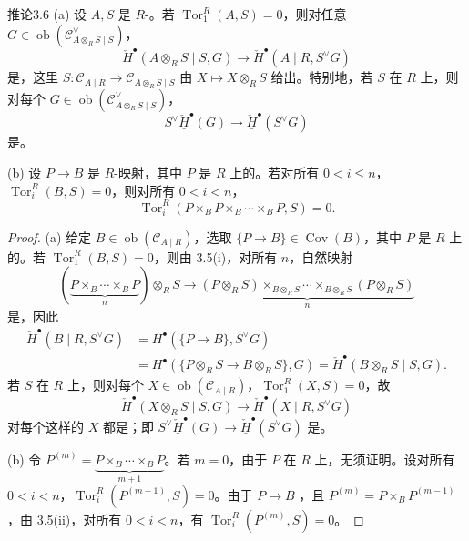 \begin{SGAresult}{推论}{3.6}
(a) 设 $A,S$ 是 $R$-。若 $\operatorname{Tor}_1^R(A,S)=0$，则对任意 $G\in\operatorname{ob}(\mathcal C_{A\otimes_R S\mid S}^{\vee})$，
\[\check H^{\bullet}(A\otimes_R S\mid S,G)\longrightarrow\check H^{\bullet}(A\mid R,S^{\vee}G)\]
是，这里 $S:\mathcal C_{A\mid R}\to\mathcal C_{A\otimes_R S\mid S}$ 由 $X\mapsto X\otimes_R S$ 给出。特别地，若 $S$ 在 $R$ 上，则对每个 $G\in\operatorname{ob}(\mathcal C_{A\otimes_R S\mid S}^{\vee})$，
\[S^{\vee}\check{\underline H}^{\bullet}(G)\longrightarrow\check{\underline H}^{\bullet}(S^{\vee}G)\]
是。

(b) 设 $P\to B$ 是 $R$-映射，其中 $P$ 是 $R$ 上的。若对所有 $0<i\leq n$，$\operatorname{Tor}_i^R(B,S)=0$，则对所有 $0<i<n$，
\[\operatorname{Tor}_i^R(P\mathbin{\times_B}P\mathbin{\times_B}\cdots\mathbin{\times_B}P,S)=0.\]
\end{SGAresult}
\begin{proof}
(a) 给定 $B\in\operatorname{ob}(\mathcal C_{A\mid R})$，选取 $\{P\to B\}\in\operatorname{Cov}(B)$，其中 $P$ 是 $R$ 上的。若 $\operatorname{Tor}_1^R(B,S)=0$，则由 3.5(i)，对所有 $n$，自然映射
\[(\underbrace{P\mathbin{\times_B}\cdots\mathbin{\times_B}P}_{n})\otimes_R S\longrightarrow\underbrace{(P\otimes_R S)\mathbin{\times_{B\otimes_R S}}\cdots\mathbin{\times_{B\otimes_R S}}(P\otimes_R S)}_{n}\]
是，因此
\[
\begin{aligned}
\check H^{\bullet}(B\mid R,S^{\vee}G)
&=H^{\bullet}(\{P\to B\},S^{\vee}G)\\
&=H^{\bullet}(\{P\otimes_R S\to B\otimes_R S\},G)
=\check H^{\bullet}(B\otimes_R S\mid S,G).
\end{aligned}
\]
若 $S$ 在 $R$ 上，则对每个 $X\in\operatorname{ob}(\mathcal C_{A\mid R})$，$\operatorname{Tor}_1^R(X,S)=0$，故
\[\check H^{\bullet}(X\otimes_R S\mid S,G)\longrightarrow\check H^{\bullet}(X\mid R,S^{\vee}G)\]
对每个这样的 $X$ 都是；即 $S^{\vee}\check{\underline H}^{\bullet}(G)\to\check{\underline H}^{\bullet}(S^{\vee}G)$ 是。

(b) 令 $P^{(m)}=\underbrace{P\mathbin{\times_B}\cdots\mathbin{\times_B}P}_{m+1}$。若 $m=0$，由于 $P$ 在 $R$ 上，无须证明。设对所有 $0<i<n$，$\operatorname{Tor}_i^R(P^{(m-1)},S)=0$。由于 $P\to B$ ，且 $P^{(m)}=P\mathbin{\times_B}P^{(m-1)}$，由 3.5(ii)，对所有 $0<i<n$，有 $\operatorname{Tor}_i^R(P^{(m)},S)=0$。
\end{proof}

